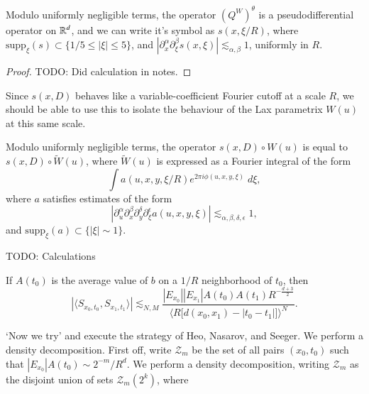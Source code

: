 \begin{lemma}
    Modulo uniformly negligible terms, the operator $(Q^W)^\theta$ is a pseudodifferential operator on $\operatorname{\mathbb{R}}^d$, and we can write it's symbol as $s(x, \xi / R)$, where $\text{supp}_\xi(s) \subset \{ 1/5 \leq |\xi| \leq 5 \}$, and $|\partial^\alpha_x \partial^\beta_\xi s(x,\xi)| \lesssim_{\alpha,\beta} 1$, uniformly in $R$.
\end{lemma}
\begin{proof}
    TODO: Did calculation in notes.
\end{proof}

Since $s(x,D)$ behaves like a variable-coefficient Fourier cutoff at a scale $R$, we should be able to use this to isolate the behaviour of the Lax parametrix $W(u)$ at this same scale.

\begin{lemma}
    Modulo uniformly negligible terms, the operator $s(x,D) \circ W(u)$ is equal to $s(x,D) \circ \tilde{W}(u)$, where $\tilde{W}(u)$ is expressed as a Fourier integral of the form
    \[ \int a(u,x,y,\xi / R) e^{2 \pi i \phi(u,x,y,\xi)}\; d\xi, \]
    where $a$ satisfies estimates of the form
    \[ |\partial_u^\alpha \partial_x^\beta \partial_y^\delta \partial_\xi^\epsilon a(u,x,y,\xi)| \lesssim_{\alpha,\beta,\delta,\epsilon} 1, \]
    and $\text{supp}_\xi(a) \subset \{ |\xi| \sim 1 \}$.
\end{lemma}

TODO: Calculations

\begin{lemma}
    If $A(t_0)$ is the average value of $b$ on a $1/R$ neighborhood of $t_0$, then
    \[ |\langle {S\!}_{x_0,t_0}, {S\!}_{x_1,t_1} \rangle| \lesssim_{N,M} \frac{|E_{x_0}| |E_{x_1}| A(t_0) A(t_1) R^{- \frac{d+3}{2}}}{\Big\langle R \Big[ d(x_0,x_1) - |t_0 - t_1| \Big] \Big\rangle^N}. \]
\end{lemma}

`Now we try' and execute the strategy of Heo, Nasarov, and Seeger. We perform a density decomposition. First off, write $\mathcal{Z}_m$ be the set of all pairs $(x_0,t_0)$ such that $|E_{x_0}| A(t_0) \sim 2^{-m} / R^d$. We perform a density decomposition, writing $\mathcal{Z}_m$ as the disjoint union of sets $\mathcal{Z}_m(2^k)$, where 

\newpage

